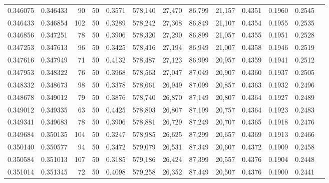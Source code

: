\begin{tabular}{rrrrrrrrrrrrr}
0.346075 & 0.346433 &    90 &  50 &                                     0.3571 & 578,140 &  27,470 &  86,799 &  21,157 & 0.4351 & 0.1960 & 0.2545 \\
0.346433 & 0.346854 &   102 &  50 &                                     0.3289 & 578,242 &  27,368 &  86,849 &  21,107 & 0.4354 & 0.1955 & 0.2535 \\
0.346856 & 0.347251 &    78 &  50 &                                     0.3906 & 578,320 &  27,290 &  86,899 &  21,057 & 0.4355 & 0.1951 & 0.2528 \\
0.347253 & 0.347613 &    96 &  50 &                                     0.3425 & 578,416 &  27,194 &  86,949 &  21,007 & 0.4358 & 0.1946 & 0.2519 \\
0.347616 & 0.347949 &    71 &  50 &                                     0.4132 & 578,487 &  27,123 &  86,999 &  20,957 & 0.4359 & 0.1941 & 0.2512 \\
0.347953 & 0.348322 &    76 &  50 &                                     0.3968 & 578,563 &  27,047 &  87,049 &  20,907 & 0.4360 & 0.1937 & 0.2505 \\
0.348332 & 0.348673 &    98 &  50 &                                     0.3378 & 578,661 &  26,949 &  87,099 &  20,857 & 0.4363 & 0.1932 & 0.2496 \\
0.348678 & 0.349012 &    79 &  50 &                                     0.3876 & 578,740 &  26,870 &  87,149 &  20,807 & 0.4364 & 0.1927 & 0.2489 \\
0.349012 & 0.349335 &    63 &  50 &                                     0.4425 & 578,803 &  26,807 &  87,199 &  20,757 & 0.4364 & 0.1923 & 0.2483 \\
0.349341 & 0.349683 &    78 &  50 &                                     0.3906 & 578,881 &  26,729 &  87,249 &  20,707 & 0.4365 & 0.1918 & 0.2476 \\
0.349684 & 0.350135 &   104 &  50 &                                     0.3247 & 578,985 &  26,625 &  87,299 &  20,657 & 0.4369 & 0.1913 & 0.2466 \\
0.350140 & 0.350577 &    94 &  50 &                                     0.3472 & 579,079 &  26,531 &  87,349 &  20,607 & 0.4372 & 0.1909 & 0.2458 \\
0.350584 & 0.351013 &   107 &  50 &                                     0.3185 & 579,186 &  26,424 &  87,399 &  20,557 & 0.4376 & 0.1904 & 0.2448 \\
0.351014 & 0.351345 &    72 &  50 &                                     0.4098 & 579,258 &  26,352 &  87,449 &  20,507 & 0.4376 & 0.1900 & 0.2441 \\

\end{tabular}
